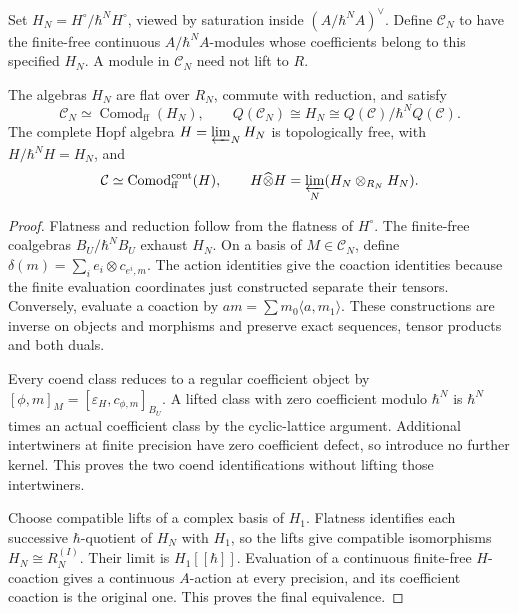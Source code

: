 Set \(H_N=H^\circ/\hbar^NH^\circ\), viewed by saturation inside
\((A/\hbar^NA)^\vee\). Define \(\mathcal C_N\) to have the
finite-free continuous \(A/\hbar^NA\)-modules whose coefficients
belong to this specified \(H_N\). A module in \(\mathcal C_N\)
need not lift to \(R\).

\begin{theorem}\label{cyrep:thm:coefficient-recognition}
The algebras \(H_N\) are flat over \(R_N\), commute with reduction,
and satisfy
\[
 \mathcal C_N\simeq\operatorname{Comod}_{\mathrm{ff}}(H_N),
 \qquad Q(\mathcal C_N)\cong H_N
                 \cong Q(\mathcal C)/\hbar^NQ(\mathcal C).
\]
The complete Hopf algebra
\(H=\varprojlim_NH_N\) is topologically free, with
\(H/\hbar^NH=H_N\), and
\[
 \mathcal C\simeq\operatorname{Comod}^{\mathrm{cont}}_{\mathrm{ff}}(H),
 \qquad H\widehat\otimes H
          =\varprojlim_N(H_N\otimes_{R_N}H_N).
\]
\end{theorem}

\begin{proof}
Flatness and reduction follow from the flatness of \(H^\circ\).
The finite-free coalgebras \(B_U/\hbar^NB_U\) exhaust \(H_N\).
On a basis of \(M\in\mathcal C_N\), define
\(\delta(m)=\sum_i e_i\otimes c_{e^i,m}\).
The action identities give the coaction identities because the
finite evaluation coordinates just constructed separate their
tensors. Conversely, evaluate a coaction by
\(am=\sum m_0\langle a,m_1\rangle\).
These constructions are inverse on objects and morphisms and
preserve exact sequences, tensor products and both duals.

Every coend class reduces to a regular coefficient object by
\([\phi,m]_M=[\varepsilon_H,c_{\phi,m}]_{B_U}\).
A lifted class with zero coefficient modulo \(\hbar^N\) is
\(\hbar^N\) times an actual coefficient class by the cyclic-lattice
argument. Additional intertwiners at finite precision have zero
coefficient defect, so introduce no further kernel. This proves
the two coend identifications without lifting those intertwiners.

Choose compatible lifts of a complex basis of \(H_1\).
Flatness identifies each successive \(\hbar\)-quotient of \(H_N\)
with \(H_1\), so the lifts give compatible isomorphisms
\(H_N\cong R_N^{(I)}\). Their limit is \(H_1[[\hbar]]\).
Evaluation of a continuous finite-free \(H\)-coaction gives a
continuous \(A\)-action at every precision, and its coefficient
coaction is the original one. This proves the final equivalence.
\end{proof}

